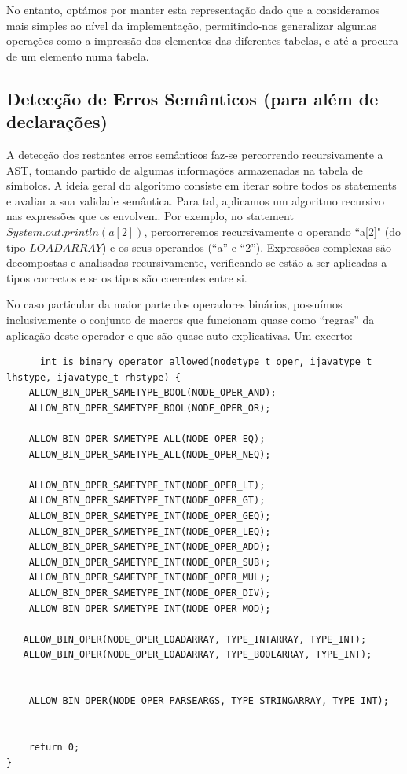\documentclass[11pt,a4paper]{article}
\begin{document}
	No entanto, optámos por manter esta representação dado que a consideramos mais simples ao nível da implementação, permitindo-nos generalizar algumas operações como a impressão dos elementos das diferentes tabelas, e até a procura de um elemento numa tabela.
	
	\pagebreak
	
	\subsection{Detecção de Erros Semânticos (para além de declarações)}
	
	A detecção dos restantes erros semânticos faz-se percorrendo recursivamente a AST, tomando partido de algumas informações armazenadas na tabela de símbolos. A ideia geral do algoritmo consiste em iterar sobre todos os statements e avaliar a sua validade semântica. Para tal, aplicamos um algoritmo recursivo nas expressões que os envolvem. Por exemplo, no statement $System.out.println(a[2])$, percorreremos recursivamente o operando ``a[2]" (do tipo $LOADARRAY$) e os seus operandos (``a'' e ``2''). Expressões complexas são decompostas e analisadas recursivamente, verificando se estão a ser aplicadas a tipos correctos e se os tipos são coerentes entre si.
	
	No caso particular da maior parte dos operadores binários, possuímos inclusivamente o conjunto de macros que funcionam quase como ``regras'' da aplicação deste operador e que são quase auto-explicativas. Um excerto:
	
	\begin{lstlisting}
	  int is_binary_operator_allowed(nodetype_t oper, ijavatype_t lhstype, ijavatype_t rhstype) {
    ALLOW_BIN_OPER_SAMETYPE_BOOL(NODE_OPER_AND);
    ALLOW_BIN_OPER_SAMETYPE_BOOL(NODE_OPER_OR);

    ALLOW_BIN_OPER_SAMETYPE_ALL(NODE_OPER_EQ);	
    ALLOW_BIN_OPER_SAMETYPE_ALL(NODE_OPER_NEQ);
    
    ALLOW_BIN_OPER_SAMETYPE_INT(NODE_OPER_LT);
    ALLOW_BIN_OPER_SAMETYPE_INT(NODE_OPER_GT);
    ALLOW_BIN_OPER_SAMETYPE_INT(NODE_OPER_GEQ);
    ALLOW_BIN_OPER_SAMETYPE_INT(NODE_OPER_LEQ);
    ALLOW_BIN_OPER_SAMETYPE_INT(NODE_OPER_ADD);
    ALLOW_BIN_OPER_SAMETYPE_INT(NODE_OPER_SUB);
    ALLOW_BIN_OPER_SAMETYPE_INT(NODE_OPER_MUL);
    ALLOW_BIN_OPER_SAMETYPE_INT(NODE_OPER_DIV);
    ALLOW_BIN_OPER_SAMETYPE_INT(NODE_OPER_MOD);
   	 
   ALLOW_BIN_OPER(NODE_OPER_LOADARRAY, TYPE_INTARRAY, TYPE_INT);
   ALLOW_BIN_OPER(NODE_OPER_LOADARRAY, TYPE_BOOLARRAY, TYPE_INT);


    ALLOW_BIN_OPER(NODE_OPER_PARSEARGS, TYPE_STRINGARRAY, TYPE_INT);
             

	return 0;
}
	\end{lstlisting}
	
\end{document}
